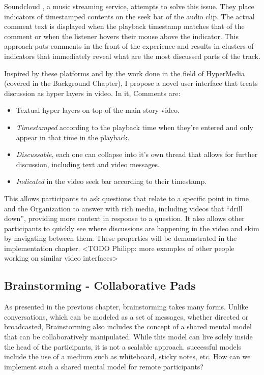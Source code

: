 Soundcloud \cite{soundcloud}, a music streaming service, attempts to solve this issue. They place indicators of timestamped contents on the seek bar of the audio clip. The actual comment text is displayed when the playback timestamp matches that of the comment or when the listener hovers their mouse above the indicator. This approach puts comments in the front of the experience and results in clusters of indicators that immediately reveal what are the most discussed parts of the track.


Inspired by these platforms and by the work done in the field of HyperMedia (covered in the Background Chapter), I propose a novel user interface that treats discussion as hyper layers in video. In it, Comments are: 

\begin{itemize}

\item Textual hyper layers on top of the main story video. 

\item \textit{Timestamped} according to the playback time when they're entered and only appear in that time in the playback. 

\item \textit{Discussable}, each one can collapse into it's own thread that allows for further discussion, including text and video messages. 

\item \textit{Indicated} in the video seek bar according to their timestamp.

\end{itemize}

This allows participants to ask questions that relate to a specific point in time and the Organization to answer with rich media, including videos that “drill down”, providing more context in response to a question. It also allows other participants to quickly see where discussions are happening in the video and skim by navigating between them. These properties will be demonstrated in the implementation chapter. <TODO Philipp: more examples of other people working on similar video interfaces>

\subsection{Brainstorming - Collaborative Pads}

As presented in the previous chapter, brainstorming takes many forms. Unlike conversations, which can be modeled as a set of messages, whether directed or broadcasted, Brainstorming also includes the concept of a shared mental model that can be collaboratively manipulated. While this model can live solely inside the head of the participants, it is not a scalable approach. successful models include the use of a medium such as whiteboard, sticky notes, etc. How can we implement such a shared mental model for remote participants?

